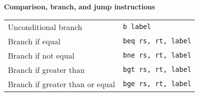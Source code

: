 \documentclass{article}
\newcommand{\pseudo}{{\ensuremath\ast}}
\begin{document}
\noindent
\textbf{Comparison, branch, and jump instructions}
\begin{center}
\begin{tabular}{ll}
Unconditional branch\pseudo & {\tt b label} \\
Branch if equal & {\tt beq rs, rt, label} \\
Branch if not equal & {\tt bne rs, rt, label} \\
Branch if greater than\pseudo & {\tt bgt rs, rt, label} \\
Branch if greater than or equal\pseudo & {\tt bge rs, rt, label} \\

\end{tabular}
\end{center}
\end{document}
